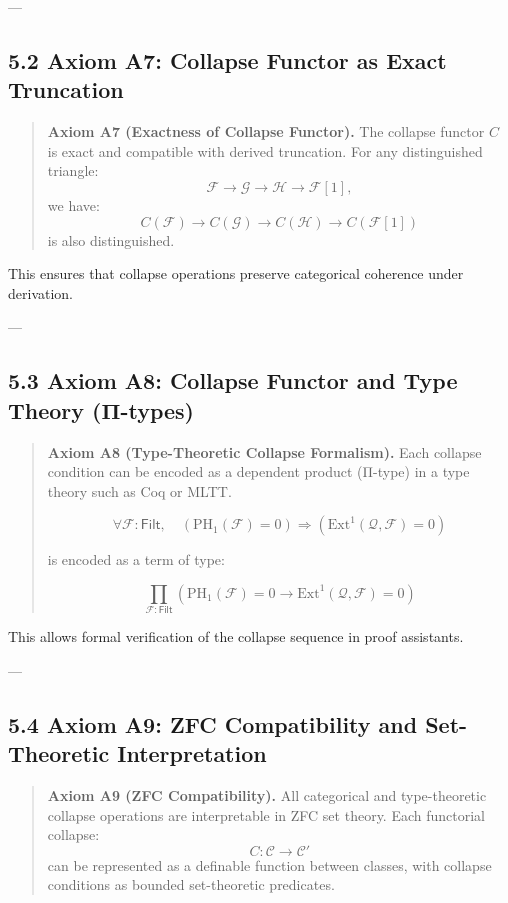 \documentclass[11pt]{article}
\begin{document}
---

\subsection*{5.2 Axiom A7: Collapse Functor as Exact Truncation}

\begin{quote}
\textbf{Axiom A7 (Exactness of Collapse Functor).}  
The collapse functor \( C \) is exact and compatible with derived truncation.  
For any distinguished triangle:
\[
\mathcal{F} \to \mathcal{G} \to \mathcal{H} \to \mathcal{F}[1],
\]
we have:
\[
C(\mathcal{F}) \to C(\mathcal{G}) \to C(\mathcal{H}) \to C(\mathcal{F}[1])
\]
is also distinguished.
\end{quote}

This ensures that collapse operations preserve categorical coherence under derivation.

---

\subsection*{5.3 Axiom A8: Collapse Functor and Type Theory (Π-types)}

\begin{quote}
\textbf{Axiom A8 (Type-Theoretic Collapse Formalism).}  
Each collapse condition can be encoded as a dependent product (Π-type) in a type theory such as Coq or MLTT.

\[
\forall \mathcal{F} : \mathsf{Filt},\quad 
\left( \mathrm{PH}_1(\mathcal{F}) = 0 \right) \Rightarrow 
\left( \mathrm{Ext}^1(\mathcal{Q}, \mathcal{F}) = 0 \right)
\]

is encoded as a term of type:

\[
\prod_{\mathcal{F}:\mathsf{Filt}} 
\left( \mathrm{PH}_1(\mathcal{F}) = 0 \rightarrow \mathrm{Ext}^1(\mathcal{Q}, \mathcal{F}) = 0 \right)
\]
\end{quote}

This allows formal verification of the collapse sequence in proof assistants.

---

\subsection*{5.4 Axiom A9: ZFC Compatibility and Set-Theoretic Interpretation}

\begin{quote}
\textbf{Axiom A9 (ZFC Compatibility).}  
All categorical and type-theoretic collapse operations are interpretable in ZFC set theory.  
Each functorial collapse:
\[
C: \mathcal{C} \to \mathcal{C}'
\]
can be represented as a definable function between classes,  
with collapse conditions as bounded set-theoretic predicates.
\end{quote}
\end{document}

